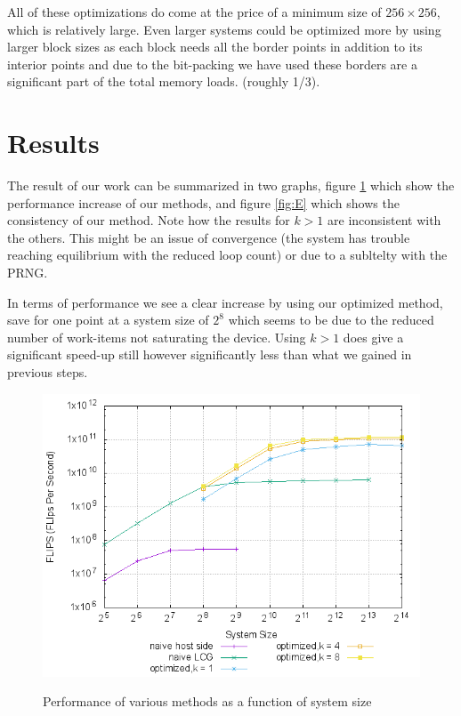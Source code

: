   All of these optimizations do come at the price of a minimum size of $256\times256$, which is relatively large. Even larger systems could be optimized more by using larger block sizes as each block needs all the border points in addition to its interior points and
  due to the bit-packing we have used these borders are a significant part of the total memory loads. (roughly 1/3).

\section{Results}
The result of our work can be summarized in two graphs, figure \ref{fig:perf} which show the performance increase of our methods, and figure \ref{fig:E} which shows the consistency of our method.
Note how the results for $k > 1$ are inconsistent with the others. This might be an issue of convergence (the system has trouble reaching equilibrium with the reduced loop count) or due to a subltelty with the PRNG.
\par In terms of performance we see a clear increase by using our optimized method, save for one point at a system size of $2^8$ which seems to be due to the reduced number of work-items not saturating the device. Using $k > 1$ does give a significant speed-up still
however significantly less than what we gained in previous steps.

\begin{figure}[!Hhp]
  \cenetring
  \includegraphics[width=\textwidth]{plots/timing.png}
  \label{fig:perf}
  \caption{Performance of various methods as a function of system size}
\end{figure}

